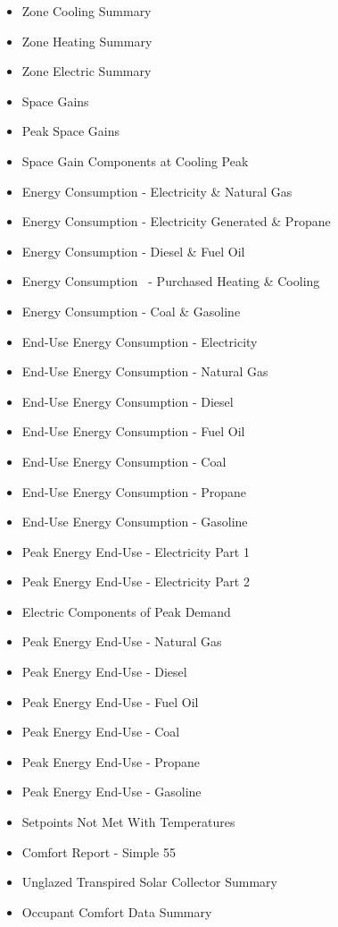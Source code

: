 \begin{itemize}
\item
  Zone Cooling Summary
\item
  Zone Heating Summary
\item
  Zone Electric Summary
\item
  Space Gains
\item
  Peak Space Gains
\item
  Space Gain Components at Cooling Peak
\item
  Energy Consumption - Electricity \& Natural Gas
\item
  Energy Consumption - Electricity Generated \& Propane
\item
  Energy Consumption - Diesel \& Fuel Oil
\item
  Energy Consumption~ - Purchased Heating \& Cooling
\item
  Energy Consumption - Coal \& Gasoline
\item
  End-Use Energy Consumption - Electricity
\item
  End-Use Energy Consumption - Natural Gas
\item
  End-Use Energy Consumption - Diesel
\item
  End-Use Energy Consumption - Fuel Oil
\item
  End-Use Energy Consumption - Coal
\item
  End-Use Energy Consumption - Propane
\item
  End-Use Energy Consumption - Gasoline
\item
  Peak Energy End-Use - Electricity Part 1
\item
  Peak Energy End-Use - Electricity Part 2
\item
  Electric Components of Peak Demand
\item
  Peak Energy End-Use - Natural Gas
\item
  Peak Energy End-Use - Diesel
\item
  Peak Energy End-Use - Fuel Oil
\item
  Peak Energy End-Use - Coal
\item
  Peak Energy End-Use - Propane
\item
  Peak Energy End-Use - Gasoline
\item
  Setpoints Not Met With Temperatures
\item
  Comfort Report - Simple 55
\item
  Unglazed Transpired Solar Collector Summary
\item
  Occupant Comfort Data Summary

\end{itemize}

